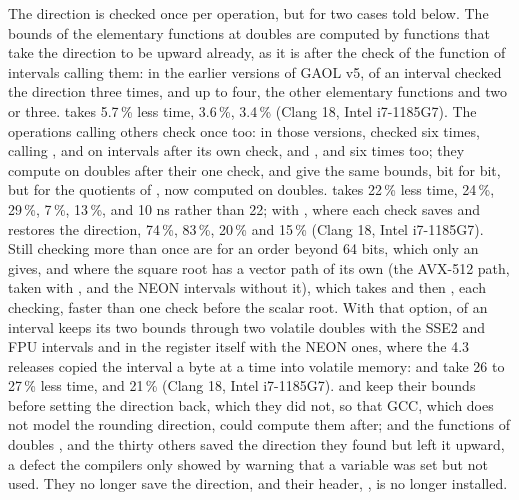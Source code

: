 \medskip
The direction is checked once per operation, but for two cases told
below.\newinvfive{} The bounds of the
elementary functions at doubles are computed by functions that take the
direction to be upward already, as it is after the check of the function of
intervals calling them: in the earlier versions of GAOL v5,  of an
interval checked the direction three times,  and  up to four, the other elementary
functions and  two or three.  takes 5.7\,\% less
time,  3.6\,\%,  3.4\,\% (Clang 18, Intel
i7-1185G7). The operations calling others check once too: in those versions,
 checked six times, calling , \code{+} and \code{/} on
intervals after its own check, and , 
and  six times too; they compute on doubles after their one
check, and give the same bounds, bit for bit, but for the quotients of
, now computed on doubles.  takes 22\,\%
less time,  24\,\%,  29\,\%,
 7\,\%,  13\,\%, and
 10 ns rather than 22; with
, where each check saves and restores the
direction,  74\,\%,  83\,\%,
 20\,\% and  15\,\% (Clang 18,
Intel i7-1185G7). Still checking more than once are 
for an order beyond 64 bits, which only an  gives, and
 where the square root has a vector path of its own (the
AVX-512 path, taken with , and the NEON intervals
without it), which takes  and then , each
checking, faster than one check before the scalar root. With that option,
 of an interval
keeps its two bounds through two volatile doubles with the SSE2 and FPU
intervals and in the register itself with the NEON ones, where the 4.3
releases copied the interval a byte at a time into volatile memory:  and
 take 26 to 27\,\% less time,  and
 21\,\% (Clang 18, Intel i7-1185G7).  and
 keep their bounds before setting the direction back, which
they did not, so that GCC, which does not model the rounding direction,
could compute them after; and the functions of doubles ,
 and the thirty others saved the direction they found but
left it upward, a defect the compilers only showed by warning that a variable
was set but not used. They no longer save the direction, and their header,
, is no longer installed.

